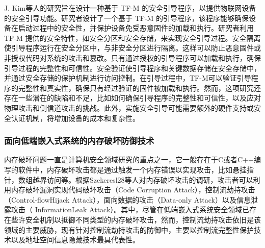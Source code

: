 \documentclass[12pt,a4paper]{ctexart}
\begin{document}
\par J. Kim等人的研究\cite{secure-bootloader}旨在设计一种基于 TF-M 的安全引导程序，以提供物联网设备的安全引导功能。研究者设计了一个基于 TF-M 的引导程序，该程序能够确保设备在启动过程中的安全性，并保护设备免受恶意固件的加载和执行。研究者利用 TF-M 提供的安全特性，如安全分区和安全存储，来实现安全引导过程。安全隔离使引导程序运行在安全分区中，与非安全分区进行隔离。这样可以防止恶意固件或非授权代码对系统的攻击和篡改。只有通过授权的引导程序可以加载和执行，确保引导过程的完整性和可信性。安全验证使引导程序和关键数据存储在安全存储中，并通过安全存储的保护机制进行访问控制。在引导过程中，TF-M可以验证引导程序的完整性和真实性，确保只有经过验证的固件被加载和执行。然而，这项研究还存在一些潜在的缺陷和不足，比如如何确保引导程序的完整性和可信性，以及应对物理攻击和侧信道攻击的挑战。此外，实施安全引导可能需要额外的硬件支持或安全认证机制，将增加设备的成本和复杂性。

\subsubsection{面向低端嵌入式系统的内存破坏防御技术}
\par 内存破坏问题一直是计算机安全领域研究的重点之一，它一般存在于C或者C++编写的软件中，内存破坏攻击都是通过触发一个内存错误以实现攻击，比如悬挂指针，数组越界访问等。根据Szekeresl28等人对内存破坏攻击的调研，攻击者可以利用内存破坏漏洞实现代码破坏攻击（Code Corruption Attack），控制流劫持攻击（Control-flowHijack Attack），面向数据的攻击（Data-only Attack）以及信息泄露攻击（ InformationLeak Attack）。其中，尽管在低端嵌入式系统安全领域已存在些许安全机制以抵御不同类型的内存破坏攻击，然而，控制流劫持攻击依旧是该领域的主要威胁，现有针对控制流劫持攻击的防御中，主要以控制流完整性保护技术以及地址空间信息隐藏技术最具代表性。
\end{document}
